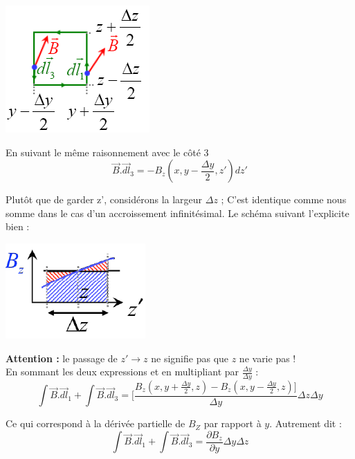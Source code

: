 \documentclass	[11pt, a4paper, openany]{book}
\begin{document}
\begin{center}
\includegraphics[scale=0.60]{magneto/image17.png}\\
\end{center}
En suivant le même raisonnement avec le côté 3
\begin{equation}
\vec{B}.\vec{dl}_3 = -B_z(x, y - \frac{\Delta y}{2}, z')dz'
\end{equation}

Plutôt que de garder z', considérons la largeur $\Delta z$ ; C'est identique comme nous somme dans le cas d'un accroissement infinitésimal. Le schéma suivant l'explicite bien :
\begin{center}
\includegraphics[scale=0.60]{magneto/image18.png}\\
\end{center}

\textbf{Attention :} le passage de $z' \rightarrow z$ ne signifie pas que $z$ ne varie pas !\\

En sommant les deux expressions et en multipliant par $\frac{\Delta y}{\Delta y}$ :
\begin{equation}
\int \vec{B}.\vec{dl}_1 + \int \vec{B}.\vec{dl}_3 = [\frac{B_z(x, y + \frac{\Delta y}{2}, z)  - B_z(x, y - \frac{\Delta y}{2}, z)]}{\Delta y}\Delta z\Delta y
\end{equation}

Ce qui correspond à la dérivée partielle de $B_Z$ par rapport à $y$. Autrement dit :
\begin{equation}
\int \vec{B}.\vec{dl}_1 + \int \vec{B}.\vec{dl}_3 = \frac{\partial B_z}{\partial y}\Delta y\Delta z
\end{equation}
\end{document}
